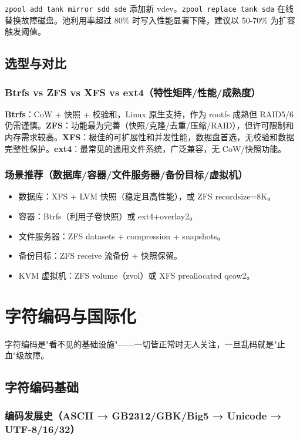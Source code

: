 \documentclass[12pt,UTF8]{ctexbook}
\begin{document}
\verb|zpool add tank mirror sdd sde| 添加新 vdev。\verb|zpool replace tank sda| 在线替换故障磁盘。池利用率超过 80\% 时写入性能显著下降，建议以 50-70\% 为扩容触发阈值。

  \section{选型与对比}
    \subsection{Btrfs vs ZFS vs XFS vs ext4（特性矩阵/性能/成熟度）}

\textbf{Btrfs}：CoW + 快照 + 校验和，Linux 原生支持，作为 rootfs 成熟但 RAID5/6 仍需谨慎。\textbf{ZFS}：功能最为完善（快照/克隆/去重/压缩/RAID），但许可限制和内存需求较高。\textbf{XFS}：极佳的可扩展性和并发性能，数据盘首选，无校验和数据完整性保护。\textbf{ext4}：最常见的通用文件系统，广泛兼容，无 CoW/快照功能。

    \subsection{场景推荐（数据库/容器/文件服务器/备份目标/虚拟机）}

\begin{itemize}
	\item 数据库：XFS + LVM 快照（稳定且高性能），或 ZFS recordsize=8K。
	\item 容器：Btrfs（利用子卷快照）或 ext4+overlay2。
	\item 文件服务器：ZFS datasets + compression + snapshots。
	\item 备份目标：ZFS receive 流备份 + 快照保留。
	\item KVM 虚拟机：ZFS volume（zvol）或 XFS preallocated qcow2。
\end{itemize}


\chapter{字符编码与国际化}
\label{chap:encoding-i18n}

字符编码是"看不见的基础设施"——一切皆正常时无人关注，一旦乱码就是"止血"级故障。

  \section{字符编码基础}
    \subsection{编码发展史（ASCII → GB2312/GBK/Big5 → Unicode → UTF-8/16/32）}
\end{document}
